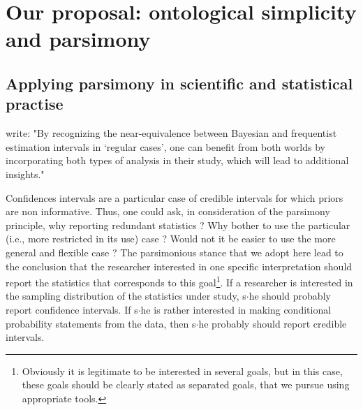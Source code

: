 \documentclass[a4paper,man,natbib,floatsintext,donotrepeattitle]{apa6}
\begin{document}



\section{Our proposal: ontological simplicity and parsimony}

\subsection{Applying parsimony in scientific and statistical practise}

\cite{albers_credible_2018} write: "By recognizing the near-equivalence between Bayesian and frequentist estimation intervals in ‘regular cases’, one can benefit from both worlds by incorporating both types of analysis in their study, which will lead to additional insights."

Confidences intervals are a particular case of credible intervals for which priors are non informative. Thus, one could ask, in consideration of the parsimony principle, why reporting redundant statistics ? Why bother to use the particular (i.e., more restricted in its use) case ? Would not it be easier to use the more general and flexible case ? The parsimonious stance that we adopt here lead to the conclusion that the researcher interested in one specific interpretation should report the statistics that corresponds to this goal\footnote{Obviously it is legitimate to be interested in several goals, but in this case, these goals should be clearly stated as separated goals, that we pursue using appropriate tools.}. If a researcher is interested in the sampling distribution of the statistics under study, s$\cdot$he should probably report confidence intervals. If s$\cdot$he is rather interested in making conditional probability statements from the data, then s$\cdot$he probably should report credible intervals.
\end{document}
